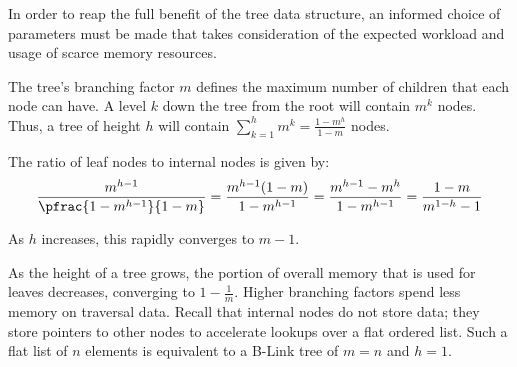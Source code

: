 

In order to reap the full benefit of the tree data structure, an informed choice
of parameters must be made that takes consideration of the expected workload and
usage of scarce memory resources.

The tree's branching factor $m$ defines the maximum number of children that each
node can have. A level $k$ down the tree from the root will contain $m^k$ nodes.
Thus, a tree of height $h$ will contain
$\sum_{k=1}^h m^k = \frac{1-m^h}{1-m}$ nodes.

The ratio of leaf nodes to internal nodes is given by:
$$
	\frac{m^{h-1}}{\pfrac{1-m^{h-1}}{1-m}}
	= \frac{m^{h-1}(1-m)}{1-m^{h-1}}
	= \frac{m^{h-1}-m^{h}}{1-m^{h-1}}
	= \frac{1-m}{m^{1-h} - 1}
$$

As $h$ increases, this rapidly converges to $m-1$.

\begin{figure}[H]
\end{figure}

As the height of a tree grows, the portion of overall memory that is used for
leaves decreases, converging to $1-\frac{1}{m}$. Higher branching factors spend
less memory on traversal data. Recall that internal nodes do not store data;
they store pointers to other nodes to accelerate lookups over a flat ordered
list. Such a flat list of $n$ elements is equivalent to a B-Link tree of $m=n$
and $h=1$.

\begin{figure}[H]
\end{figure}

